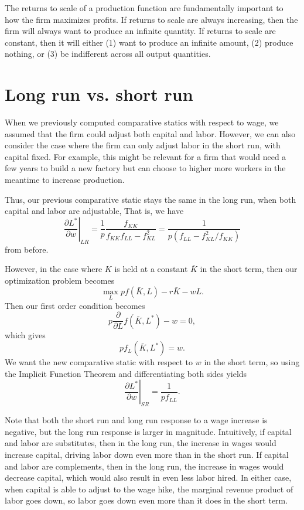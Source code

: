 The returns to scale of a production function are fundamentally important to how the firm maximizes profits. If returns to scale are always increasing, then the firm will always want to produce an infinite quantity. If returns to scale are constant, then it will either (1) want to produce an infinite amount, (2) produce nothing, or (3) be indifferent across all output quantities.

\section{Long run vs. short run}


When we previously computed comparative statics with respect to wage, we assumed that the firm could adjust both capital and labor. However, we can also consider the case where the firm can only adjust labor in the short run, with capital fixed. For example, this might be relevant for a firm that would need a few years to build a new factory but can choose to higher more workers in the meantime to increase production.

Thus, our previous comparative static stays the same in the long run, when both capital and labor are adjustable, That is, we have 
$$\left.\frac{\partial L^{*}}{\partial w}\right|_{L R}=\frac{1}{p} \frac{f_{K K}}{f_{K K} f_{L L}-f_{K L}^{2}}=\frac{1}{p\left(f_{L L}-f_{K L}^{2} / f_{K K}\right)}$$
from before.

However, in the case where $K$ is held at a constant $\bar{K}$ in the short term, then our optimization problem becomes
$$\max_L pf(\bar{K}, L) - r\bar{K} - wL.$$
Then our first order condition becomes
$$p\frac{\partial}{\partial L} f(\bar{K}, L^*) - w = 0,$$
which gives
$$pf_L(\bar{K}, L^*) = w.$$
We want the new comparative static with respect to $w$ in the short term, so using the Implicit Function Theorem and differentiating both sides yields
$$\left.\frac{\partial L^{*}}{\partial w}\right|_{S R}=\frac{1}{p f_{L L}}.$$

Note that both the short run and long run response to a wage increase is negative, but the long run response is larger in magnitude. Intuitively, if capital and labor are substitutes, then in the long run, the increase in wages would increase capital, driving labor down even more than in the short run. If capital and labor are complements, then in the long run, the increase in wages would decrease capital, which would also result in even less labor hired. In either case, when capital is able to adjust to the wage hike, the marginal revenue product of labor goes down, so labor goes down even more than it does in the short term.

